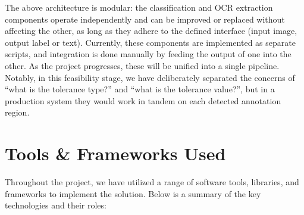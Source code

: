 \documentclass[11pt,a4paper]{article}
\begin{document}

The above architecture is modular: the classification and OCR extraction components operate independently and can be improved or replaced without affecting the other, as long as they adhere to the defined interface (input image, output label or text). Currently, these components are implemented as separate scripts, and integration is done manually by feeding the output of one into the other. As the project progresses, these will be unified into a single pipeline. Notably, in this feasibility stage, we have deliberately separated the concerns of “what is the tolerance type?” and “what is the tolerance value?”, but in a production system they would work in tandem on each detected annotation region.

\section{Tools \& Frameworks Used}
Throughout the project, we have utilized a range of software tools, libraries, and frameworks to implement the solution. Below is a summary of the key technologies and their roles:
\end{document}
